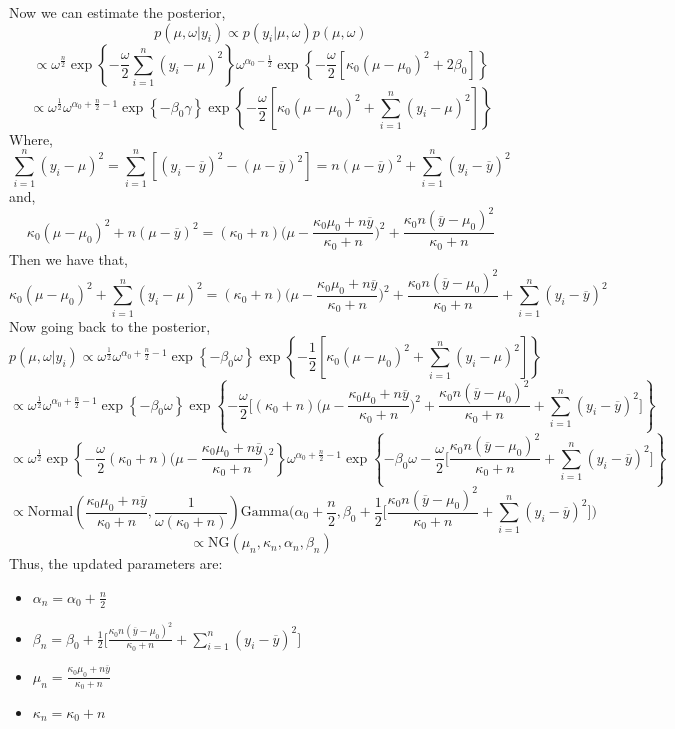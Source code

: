 \documentclass[twoside]{article}
\begin{document}
Now we can estimate the posterior,
$$ p(\mu, \omega|y_i) \propto p(y_i|\mu, \omega) p(\mu, \omega) $$
$$ \propto  \omega^{\frac{n}{2}} \exp\left\{ -\frac{\omega}{2} \sum_{i=1}^{n} (y_i - \mu)^2 \right\} 
 \omega^{\alpha_0-\frac{1}{2}} 
\exp\left\{ -\frac{\omega }{2} [\kappa_0(\mu - \mu_0)^2 + 2\beta_0] \right\} $$
$$  \propto \omega^{\frac{1}{2}}  \omega^{\alpha_0 + \frac{n}{2}-1 } 
\exp\left\{ -\beta_0 \gamma \right\} 
\exp\left\{ -\frac{\omega}{2} [ \kappa_0(\mu - \mu_0)^2 + \sum_{i=1}^{n} (y_i - \mu)^2 ] \right\} 
$$
Where,
$$ \sum_{i=1}^{n} (y_i - \mu)^2 = \sum_{i=1}^{n} [(y_i - \overline{y} )^2 - (\mu - \overline{y})^2 ] = n(\mu - \overline{y})^2+ \sum_{i=1}^{n} (y_i - \overline{y})^2
$$
and,
$$ 
 \kappa_0(\mu - \mu_0)^2  + n(\mu - \overline{y})^2 = 
 ( \kappa_0 + n)\bigg( \mu - \frac{\kappa_0 \mu_0 + n\overline{y}}{\kappa_0 + n} \bigg)^2+
 \frac{\kappa_0 n (\overline{y}-\mu_0)^2}{\kappa_0+n}
$$
Then we have that,
$$\kappa_0(\mu - \mu_0)^2 + \sum_{i=1}^{n} (y_i - \mu)^2 
= (\kappa_0 + n) \bigg( \mu - \frac{\kappa_0 \mu_0 + n\overline{y}}{\kappa_0 + n} \bigg)^2
+ \frac{\kappa_0 n (\overline{y}-\mu_0)^2}{\kappa_0+n} + \sum_{i=1}^{n} (y_i - \overline{y})^2 $$
Now going back to the posterior,
$$ p(\mu, \omega|y_i) \propto  \omega^{\frac{1}{2}}  \omega^{\alpha_0 + \frac{n}{2}-1 } 
\exp\left\{ -\beta_0 \omega \right\} 
\exp\left\{ -\frac{1}{2} [ \kappa_0(\mu - \mu_0)^2 + \sum_{i=1}^{n} (y_i - \mu)^2 ] \right\} $$ $$
\propto  \omega^{\frac{1}{2}}  \omega^{\alpha_0 + \frac{n}{2}-1 } 
\exp\left\{ -\beta_0 \omega \right\} 
\exp\left\{ -\frac{\omega}{2} \bigg[  (\kappa_0 + n) \bigg( \mu - \frac{\kappa_0 \mu_0 + n\overline{y}}{\kappa_0 + n} \bigg)^2 +
\frac{\kappa_0 n (\overline{y}-\mu_0)^2}{\kappa_0+n} + \sum_{i=1}^{n} (y_i - \overline{y})^2 \bigg] \right\} $$
$$ \propto
\omega^{\frac{1}{2}} \exp\left\{ -\frac{\omega}{2}  (\kappa_0 + n)  \bigg( \mu - \frac{\kappa_0 \mu_0 + n\overline{y}}{\kappa_0 + n} \bigg)^2 \right\} 
\omega^{\alpha_0 + \frac{n}{2}-1 } \exp\left\{ -\beta_0 \omega
 -\frac{\omega}{2} \bigg[
\frac{\kappa_0 n (\overline{y}-\mu_0)^2}{\kappa_0+n} + \sum_{i=1}^{n} (y_i - \overline{y})^2 \bigg]
\right\} 
$$
$$ \propto
\mbox{Normal}\left( \frac{\kappa_0 \mu_0 + n\overline{y}}{\kappa_0 + n},  \frac{1}{\omega(\kappa_0 + n)}
\right) 
\mbox{Gamma}\bigg(\alpha_0 + \frac{n}{2}, \beta_0 + \frac{1}{2} \bigg[
\frac{\kappa_0 n (\overline{y}-\mu_0)^2}{\kappa_0+n} + \sum_{i=1}^{n} (y_i - \overline{y})^2 \bigg] \bigg)
$$
$$\propto \mbox{NG}(\mu_n, \kappa_n, \alpha_n, \beta_n)$$
Thus, the updated parameters are:
\begin{itemize}
	\item  $\alpha_n = \alpha_0 + \frac{n}{2} $
	\item $ \beta_n = \beta_0 + \frac{1}{2} \bigg[
	\frac{\kappa_0 n (\overline{y}-\mu_0)^2}{\kappa_0+n} + \sum_{i=1}^{n} (y_i - \overline{y})^2 \bigg]  $
	\item $ \mu_n =  \frac{\kappa_0 \mu_0 + n\overline{y}}{\kappa_0 + n}$ 
	\item $ \kappa_n = \kappa_0 + n$
\end{itemize}
\end{document}
